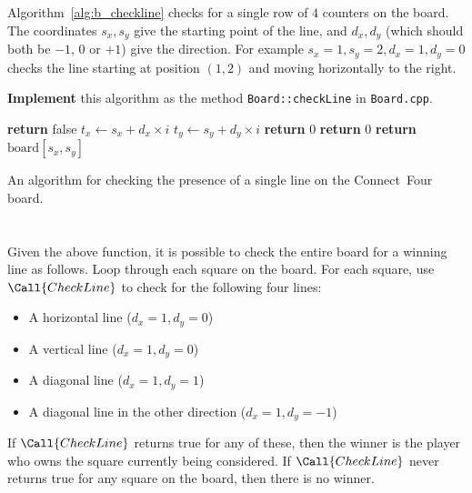 Algorithm~\ref{alg:b_checkline} checks for a single row of $4$ counters on the board.
The coordinates $s_x, s_y$ give the starting point of the line,
and $d_x, d_y$ (which should both be $-1$, $0$ or $+1$) give the direction.
For example $s_x=1, s_y=2, d_x=1, d_y=0$ checks the line starting at position $(1,2)$
and moving horizontally to the right.

\textbf{Implement} this algorithm as the method \lstinline{Board::checkLine} in \texttt{Board.cpp}.

\begin{algorithm}[t]
\begin{algorithmic}
            \State \textbf{return} false
        \EndIf
            \State $t_x \gets s_x + d_x \times i$
            \State $t_y \gets s_y + d_y \times i$
                \State \textbf{return} 0
                \State \textbf{return} 0
            \EndIf
        \EndFor
        \State \textbf{return} $\text{board}[s_x, s_y]$
    \EndProcedure
\end{algorithmic}
\caption{An algorithm for checking the presence of a single line on the Connect~Four board.}
\label{alg:b_checkline}
\end{algorithm}

\section{}

Given the above function, it is possible to check the entire board for a winning line as follows.
Loop through each square on the board.
For each square, use $\Call{CheckLine}$ to check for the following four lines:
\begin{itemize}
\item A horizontal line ($d_x=1, d_y=0$)
\item A vertical line ($d_x=1, d_y=0$)
\item A diagonal line ($d_x=1, d_y=1$)
\item A diagonal line in the other direction ($d_x=1, d_y=-1$)
\end{itemize}
If $\Call{CheckLine}$ returns true for any of these, then the winner is the player who owns the square
currently being considered.
If $\Call{CheckLine}$ never returns true for any square on the board, then there is no winner.

